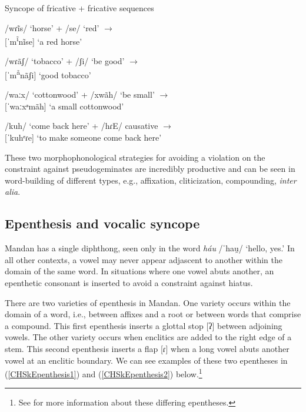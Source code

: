 \begin{exe}
    \item\label{CHSkEx3} Syncope of fricative + fricative sequences

    \begin{xlist}
        \item\label{CHSkEx3a} /wɾĩs/ `horse' + /se/ `red' $\to$\\
        {[}ˈm\textsuperscript{ĩ}nĩse] `a red horse'
        \item\label{CHSkEx3b} /wɾãʃ/ `tobacco' + /ʃi/ `be good' $\to$\\
        {[}ˈm\textsuperscript{ã}nãʃi] `good tobacco'
        \item\label{CHSkEx3c} /waːx/ `cottonwood' + /xwãh/ `be small' $\to$\\
        {[}ˈwaːxᵃmãh] `a small cottonwood'
        \item\label{CHSkEx3d} /kuh/ `come back here' + /hɾE/ causative $\to$\\
        {[}ˈkuhᵉɾe] `to make someone come back here'
    \end{xlist}
\end{exe}

These two morphophonological strategies for avoiding a violation on the constraint against pseudogeminates are incredibly productive and can be seen in word-building of different types, e.g., affixation, cliticization, compounding, \textit{inter alia}.

\subsection{Epenthesis and vocalic syncope}\label{CHSk2.2}

Mandan has a single diphthong, seen only in the word \textit{háu} /ˈhau̯/ `hello, yes.' In all other contexts, a vowel may never appear adjascent to another within the domain of the same word. In situations where one vowel abuts another, an epenthetic consonant is inserted to avoid a constraint against hiatus.

There are two varieties of epenthesis in Mandan. One variety occurs within the domain of a word, i.e., between affixes and a root or between words that comprise a compound. This first epenthesis inserts a glottal stop [ʔ] between adjoining vowels. The other variety occurs when enclitics are added to the right edge of a stem. This second epenthesis inserts a flap [ɾ] when a long vowel abuts another vowel at an enclitic boundary. We can see examples of these two epentheses in (\ref{CHSkEpenthesis1}) and (\ref{CHSkEpenthesis2}) below.\footnote{See  for more information about these differing epentheses.}

